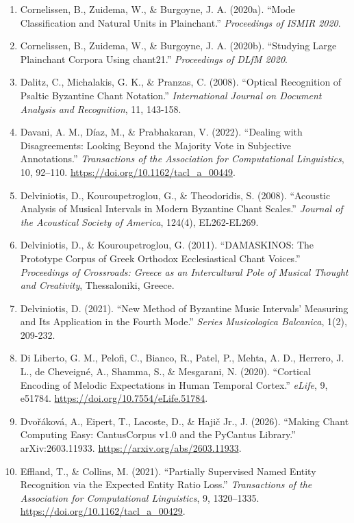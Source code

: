 \documentclass[11pt,a4paper]{article}
\begin{document}
\begin{enumerate}
\item
 Cornelissen, B., Zuidema, W., \& Burgoyne, J. A. (2020a). ``Mode Classification and Natural Units in Plainchant.'' \emph{Proceedings of ISMIR 2020}.
\item
 Cornelissen, B., Zuidema, W., \& Burgoyne, J. A. (2020b). ``Studying Large Plainchant Corpora Using chant21.'' \emph{Proceedings of DLfM 2020}.
\item
 Dalitz, C., Michalakis, G. K., \& Pranzas, C. (2008). ``Optical Recognition of Psaltic Byzantine Chant Notation.'' \emph{International Journal on Document Analysis and Recognition}, 11, 143-158.
\item
 Davani, A. M., Díaz, M., \& Prabhakaran, V. (2022). ``Dealing with Disagreements: Looking Beyond the Majority Vote in Subjective Annotations.'' \emph{Transactions of the Association for Computational Linguistics}, 10, 92--110. \url{https://doi.org/10.1162/tacl_a_00449}.
\item
 Delviniotis, D., Kouroupetroglou, G., \& Theodoridis, S. (2008). ``Acoustic Analysis of Musical Intervals in Modern Byzantine Chant Scales.'' \emph{Journal of the Acoustical Society of America}, 124(4), EL262-EL269.
\item
 Delviniotis, D., \& Kouroupetroglou, G. (2011). ``DAMASKINOS: The Prototype Corpus of Greek Orthodox Ecclesiastical Chant Voices.'' \emph{Proceedings of Crossroads: Greece as an Intercultural Pole of Musical Thought and Creativity}, Thessaloniki, Greece.
\item
 Delviniotis, D. (2021). ``New Method of Byzantine Music Intervals' Measuring and Its Application in the Fourth Mode.'' \emph{Series Musicologica Balcanica}, 1(2), 209-232.
\item
 Di Liberto, G. M., Pelofi, C., Bianco, R., Patel, P., Mehta, A. D., Herrero, J. L., de Cheveign\'{e}, A., Shamma, S., \& Mesgarani, N. (2020). ``Cortical Encoding of Melodic Expectations in Human Temporal Cortex.'' \emph{eLife}, 9, e51784. \url{https://doi.org/10.7554/eLife.51784}.
\item
 Dvořáková, A., Eipert, T., Lacoste, D., \& Hajič Jr., J. (2026). ``Making Chant Computing Easy: CantusCorpus v1.0 and the PyCantus Library.'' arXiv:2603.11933. \url{https://arxiv.org/abs/2603.11933}.
\item
 Effland, T., \& Collins, M. (2021). ``Partially Supervised Named Entity Recognition via the Expected Entity Ratio Loss.'' \emph{Transactions of the Association for Computational Linguistics}, 9, 1320--1335. \url{https://doi.org/10.1162/tacl_a_00429}.

\end{enumerate}
\end{document}
